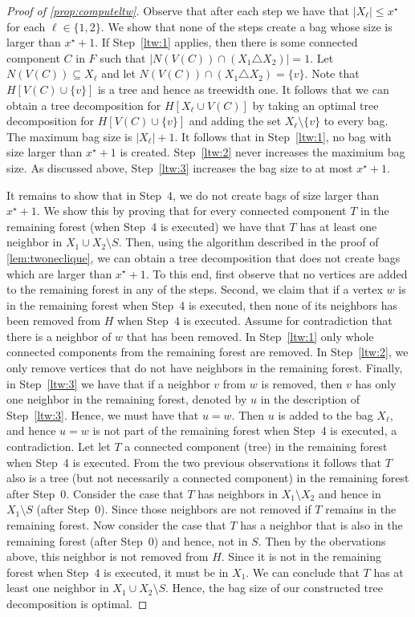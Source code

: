 \documentclass[a4paper,UKenglish,cleveref, autoref, thm-restate, numberwithinsect]{lipics-v2021}
\newcounter{algorithm}
\begin{document}
\begin{proof}[Proof of \cref{prop:computeltw}]
Observe that after each step we have that $|X_\ell|\le x^\star$ for each $\ell\in\{1,2\}$.
We show that none of the steps create a bag whose size is larger than $x^\star+1$.
If Step~\ref{ltw:1} applies, then there is some connected component $C$ in $F$ such that $|N(V(C))\cap (X_1\triangle X_2)|=1$.
Let $N(V(C))\subseteq X_\ell$ and let $N(V(C))\cap (X_1\triangle X_2)=\{v\}$. Note that $H[V(C)\cup\{v\}]$ is a tree and hence as treewidth one. It follows that we can obtain a tree decomposition for $H[X_\ell\cup V(C)]$ by taking an optimal tree decomposition for $H[V(C)\cup\{v\}]$ and adding the set $X_\ell\setminus \{v\}$ to every bag. The maximum bag size is $|X_\ell|+1$. It follows that in Step~\ref{ltw:1}, no bag with size larger than $x^\star+1$ is created.
Step~\ref{ltw:2} never increases the maximium bag size. As discussed above, Step~\ref{ltw:3} increases the bag size to at most $x^\star+1$. 

It remains to show that in Step~4, we do not create bags of size larger than $x^\star+1$. We show this by proving that for every connected component $T$ in the remaining forest (when Step~4 is executed) we have that $T$ has at least one neighbor in $X_1\cup X_2\setminus S$. Then, using the algorithm described in the proof of \cref{lem:twoneclique}, we can obtain a tree decomposition that does not create bags which are larger than $x^\star+1$.
To this end, first observe that no vertices are added to the remaining forest in any of the steps. Second, we claim that if a vertex $w$ is in the remaining forest when Step~4 is executed, then none of its neighbors has been removed from $H$ when Step~4 is executed. Assume for contradiction that there is a neighbor of $w$ that has been removed. In Step~\ref{ltw:1} only whole connected components from the remaining forest are removed. In Step~\ref{ltw:2}, we only remove vertices that do not have neighbors in the remaining forest. Finally, in Step~\ref{ltw:3} we have that if a neighbor $v$ from $w$ is removed, then $v$ has only one neighbor in the remaining forest, denoted by $u$ in the description of Step~\ref{ltw:3}. Hence, we must have that $u=w$. Then $u$ is added to the bag $X_\ell$, and hence $u=w$ is not part of the remaining forest when Step~4 is executed, a contradiction.
Let let $T$ a connected component (tree) in the remaining forest when Step~4 is executed. From the two previous observations it follows that $T$ also is a tree (but not necessarily a connected component) in the remaining forest after Step~0. Consider the case that $T$ has neighbors in $X_1\setminus X_2$ and hence in $X_1\setminus S$ (after Step~0). Since those neighbors are not removed if $T$ remains in the remaining forest. Now consider the case that $T$ has a neighbor that is also in the remaining forest (after Step~0) and hence, not in $S$. Then by the obervations above, this neighbor is not removed from $H$. Since it is not in the remaining forest when Step~4 is executed, it must be in $X_1$. We can conclude that $T$ has at least one neighbor in $X_1\cup X_2\setminus S$.
Hence, the bag size of our constructed tree decomposition is optimal.


\end{proof}
\end{document}
